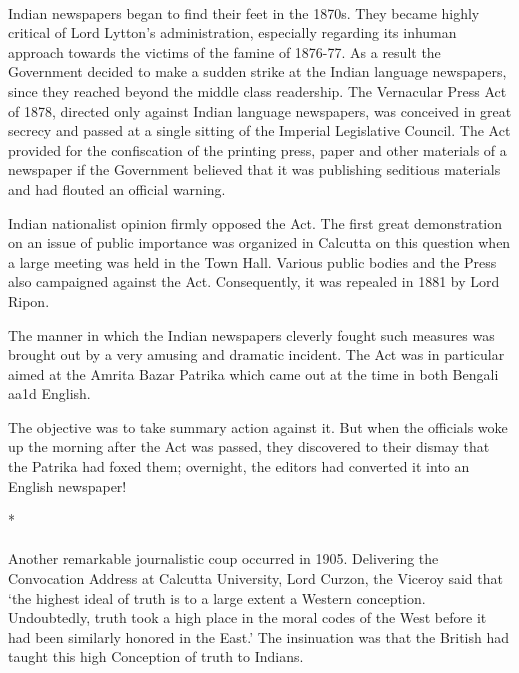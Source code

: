 \paragraph*{}


Indian newspapers began to find their feet in the 1870s. They became highly critical of Lord Lytton's administration, especially regarding its inhuman approach towards the victims of the famine of 1876-77. As a result the Government decided to make a sudden strike at the Indian language newspapers, since they reached beyond the middle class readership. The Vernacular Press Act of 1878, directed only against Indian language newspapers, was conceived in great secrecy and passed at a single sitting of the Imperial Legislative Council. The Act provided for the confiscation of the printing press, paper and other materials of a newspaper if the Government believed that it was publishing seditious materials and had flouted an official warning.

Indian nationalist opinion firmly opposed the Act. The first great demonstration on an issue of public importance was organized in Calcutta on this question when a large meeting was held in the Town Hall. Various public bodies and the Press also campaigned against the Act. Consequently, it was repealed in 1881 by Lord Ripon.

The manner in which the Indian newspapers cleverly fought such measures was brought out by a very amusing and dramatic incident. The Act was in particular aimed at the Amrita Bazar Patrika which came out at the time in both Bengali aa1d English.

The objective was to take summary action against it. But when the officials woke up the morning after the Act was passed, they discovered to their dismay that the Patrika had foxed them; overnight, the editors had converted it into an English newspaper!

\begin{center}*\end{center}

\paragraph*{}


Another remarkable journalistic coup occurred in 1905. Delivering the Convocation Address at Calcutta University, Lord Curzon, the Viceroy said that `the highest ideal of truth is to a large extent a Western conception. Undoubtedly, truth took a high place in the moral codes of the West before it had been similarly honored in the East.' The insinuation was that the British had taught this high Conception of truth to Indians.

